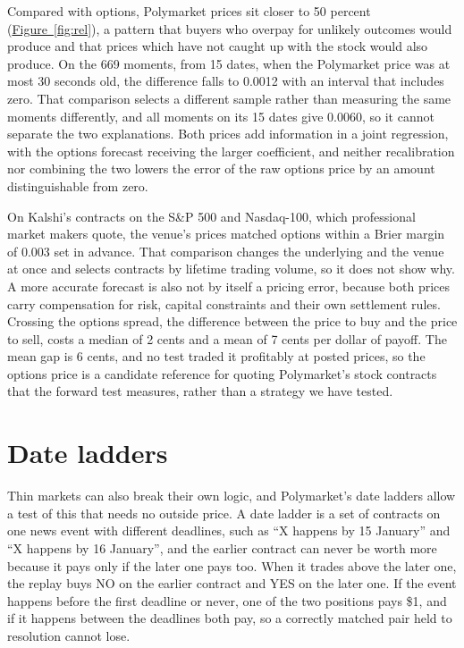 \documentclass[11pt]{article}
\newcommand{\lref}[2]{\hyperref[#2]{#1~\ref*{#2}}}
\begin{document}
Compared with options, Polymarket prices sit closer to 50 percent (\lref{Figure}{fig:rel}), a pattern that buyers who overpay for unlikely outcomes would produce and that prices which have not caught up with the stock would also produce. On the 669 moments, from 15 dates, when the Polymarket price was at most 30 seconds old, the difference falls to 0.0012 with an interval that includes zero. That comparison selects a different sample rather than measuring the same moments differently, and all moments on its 15 dates give 0.0060, so it cannot separate the two explanations. Both prices add information in a joint regression, with the options forecast receiving the larger coefficient, and neither recalibration nor combining the two lowers the error of the raw options price by an amount distinguishable from zero.

On Kalshi's contracts on the S\&P 500 and Nasdaq-100, which professional market makers quote, the venue's prices matched options within a Brier margin of 0.003 set in advance. That comparison changes the underlying and the venue at once and selects contracts by lifetime trading volume, so it does not show why. A more accurate forecast is also not by itself a pricing error, because both prices carry compensation for risk, capital constraints and their own settlement rules. Crossing the options spread, the difference between the price to buy and the price to sell, costs a median of 2 cents and a mean of 7 cents per dollar of payoff. The mean gap is 6 cents, and no test traded it profitably at posted prices, so the options price is a candidate reference for quoting Polymarket's stock contracts that the forward test measures, rather than a strategy we have tested.

\section{Date ladders}\label{sec:lad}
Thin markets can also break their own logic, and Polymarket's date ladders allow a test of this that needs no outside price. A date ladder is a set of contracts on one news event with different deadlines, such as ``X happens by 15 January'' and ``X happens by 16 January'', and the earlier contract can never be worth more because it pays only if the later one pays too. When it trades above the later one, the replay buys NO on the earlier contract and YES on the later one. If the event happens before the first deadline or never, one of the two positions pays \$1, and if it happens between the deadlines both pay, so a correctly matched pair held to resolution cannot lose.
\end{document}
